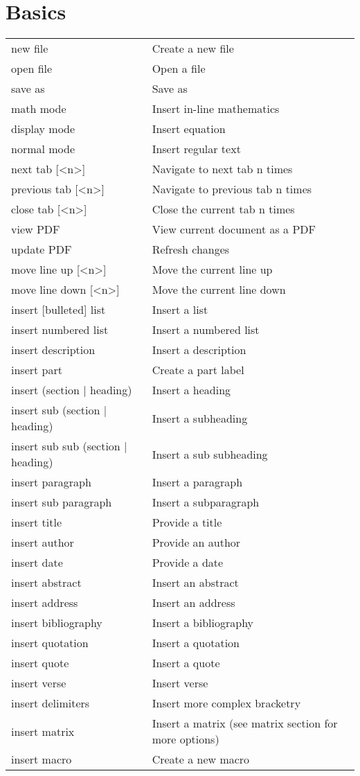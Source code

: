 \documentclass[12pt]{article}
\begin{document}
\section{Basics}
\begin{tabularx}{\linewidth}{ l X}
new file & Create a new file \\
open file & Open a file \\
save as & Save as \\
math mode & Insert in-line mathematics \\
display mode & Insert equation \\
normal mode & Insert regular text \\
next tab [<n>] & Navigate to next tab n times \\
previous tab [<n>] & Navigate to previous tab n times \\
close tab [<n>] & Close the current tab n times \\
view PDF & View current document as a PDF \\
update PDF & Refresh changes \\
move line up [<n>] & Move the current line up \\
move line down [<n>] & Move the current line down \\
\hline
insert [bulleted] list & Insert a list \\
insert numbered list & Insert a numbered list \\
insert description & Insert a description \\
insert part & Create a part label \\
insert (section | heading) & Insert a heading \\
insert sub (section | heading) & Insert a subheading \\
insert sub sub (section | heading) & Insert a sub subheading \\
insert paragraph & Insert a paragraph \\
insert sub paragraph & Insert a subparagraph \\
insert title & Provide a title \\
insert author & Provide an author \\
insert date & Provide a date \\
insert abstract & Insert an abstract \\
insert address & Insert an address \\
insert bibliography & Insert a bibliography \\
insert quotation & Insert a quotation \\
insert quote & Insert a quote \\
insert verse & Insert verse \\
insert delimiters & Insert more complex bracketry \\
insert matrix & Insert a matrix (see matrix section for more options) \\
insert macro & Create a new macro \\
\end{tabularx}
\end{document}
